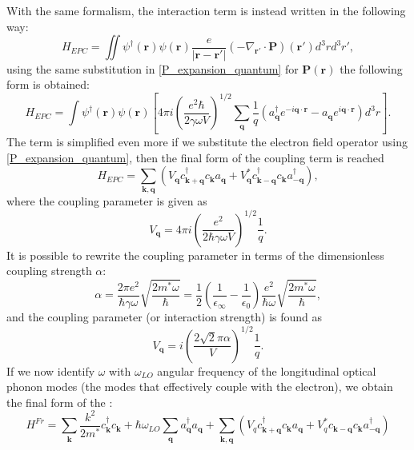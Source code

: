 With the same formalism, the interaction term is instead written in the following way:
\begin{equation}
    H_{EPC}=\iint\psi^\dagger(\mathbf{r})\psi(\mathbf{r})\frac{e}{|\mathbf{r}-\mathbf{r}'|}(-\nabla_{\mathbf{r}'}\cdot\mathbf{P})(\mathbf{r}')d^3rd^3r',
\end{equation}
using the same substitution in \ref{P_expansion_quantum} for $\mathbf{P}(\mathbf{r})$ the following form is obtained:
\begin{equation}
    H_{EPC}=\int \psi^\dagger(\mathbf{r})\psi(\mathbf{r})\left[4\pi i \left(\frac{e^2\hbar}{2\gamma\omega V}\right)^{1/2}\sum_\mathbf{q}\frac{1}{q}(a^\dagger_\mathbf{q}e^{-i\mathbf{q}\cdot\mathbf{r}}-a_\mathbf{q}e^{i\mathbf{q}\cdot\mathbf{r}})d^3r\right].
\end{equation}
The term is simplified even more if we substitute the electron field operator using \ref{P_expansion_quantum}, then the final form of 
the coupling term is reached
\begin{equation}
    H_{EPC}=\sum_{\mathbf{k},\mathbf{q}}(V_\mathbf{q}c^\dagger_\mathbf{k+q}c_\mathbf{k}a_\mathbf{q}+V^*_\mathbf{q}c^\dagger_\mathbf{k-q}c_\mathbf{k}a^\dagger_\mathbf{-q}),
\end{equation}
where the coupling parameter is given as 
\begin{equation}
    V_\mathbf{q}=4\pi i\left(\frac{e^2}{2\hbar\gamma\omega V}\right)^{1/2}\frac{1}{q}.
\end{equation}
It is possible to rewrite the coupling parameter in terms of the dimensionless coupling strength $\alpha$:
\begin{equation}
    \alpha=\frac{2\pi e^2}{\hbar\gamma\omega}\sqrt{\frac{2m^*\omega}{\hbar}}=\frac{1}{2}\left(\frac{1}{\epsilon_\infty}-\frac{1}{\epsilon_0}\right)\frac{e^2}{\hbar\omega}\sqrt{\frac{2m^*\omega}{\hbar}},
    \label{froehlich_param}
\end{equation}
and the coupling parameter (or interaction strength) is found as
\begin{equation}
    V_\mathbf{q}=i\left(\frac{2\sqrt{2}\pi\alpha}{V}\right)^{1/2}\frac{1}{q}.
    \label{simple_froehlich_coupling_strength}
\end{equation}
If we now identify $\omega$ with $\omega_{LO}$ angular frequency of the longitudinal optical phonon modes (the modes that effectively 
couple with the electron), we obtain the final form of the :
\begin{equation}
    H^{Fr}=\sum_\mathbf{k}\frac{k^2}{2m^*}c^\dagger_{\mathbf{k}}c_\mathbf{k}+\hbar\omega_{LO}\sum_\mathbf{q}a^\dagger_\mathbf{q}a_\mathbf{q}+\sum_{\mathbf{k},\mathbf{q}}(V_qc^\dagger_{\mathbf{k}+\mathbf{q}}c_\mathbf{k}a_\mathbf{q}+V_q^*c_{\mathbf{k}-\mathbf{q}}c_\mathbf{k}a^\dagger_\mathbf{-q})
    \label{Froehlich_Hamiltonian_second}
\end{equation}
